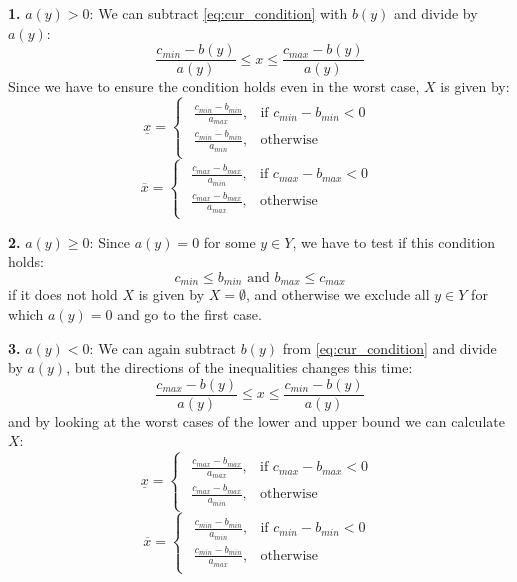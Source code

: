 \textbf{1.
}
$a(y) > 0$:
We can subtract \ref{eq:cur_condition} with $b(y)$ and divide by $a(y)$:
\[
	\frac{c_{min}-b(y)}{a(y)} \leq x \leq \frac{c_{max}-b(y)}{a(y)}
\]
Since we have to ensure the condition holds even in the worst case, $X$ is given by:
\[
	\underline{x} =
	\begin{cases}
		\begin{array}{ll}
			\frac{c_{min}-b_{min}}{a_{max}}, & \text{if } c_{min}-b_{min} < 0 \\[10pt]
			\frac{c_{min}-b_{min}}{a_{min}}, & \text{otherwise}
		\end{array}
	\end{cases}
\]
\[
	\overline{x} =
	\begin{cases}
		\begin{array}{ll}
			\frac{c_{max}-b_{max}}{a_{min}}, & \text{if } c_{max}-b_{max} < 0 \\[10pt]
			\frac{c_{max}-b_{max}}{a_{max}}, & \text{otherwise}
		\end{array}
	\end{cases}
\]

\textbf{2.}
$a(y) \geq 0$:
Since $a(y) = 0$ for some $y\in Y$, we have to test if this condition holds:
\[
	c_{min} \leq b_{min} \text{ and } b_{max} \leq c_{max}
\]
if it does not hold $X$ is given by $X=\emptyset$, and otherwise we exclude all $y\in Y$ for which $a(y)=0$ and go to the first case.

\textbf{3.}
$a(y) < 0$:
We can again subtract $b(y)$ from \ref{eq:cur_condition} and divide by $a(y)$, but the directions of the inequalities changes this time:
\[
	\frac{c_{max}-b(y)}{a(y)} \leq x \leq \frac{c_{min}-b(y)}{a(y)}
\]
and by looking at the worst cases of the lower and upper bound we can calculate $X$:
\[
	\underline{x} =
	\begin{cases}
		\begin{array}{ll}
			\frac{c_{max}-b_{max}}{a_{max}}, & \text{if } c_{max}-b_{max} < 0 \\[10pt]
			\frac{c_{max}-b_{max}}{a_{min}}, & \text{otherwise}
		\end{array}
	\end{cases}
\]
\[
	\overline{x} =
	\begin{cases}
		\begin{array}{ll}
			\frac{c_{min}-b_{min}}{a_{min}}, & \text{if } c_{min}-b_{min} < 0 \\[10pt]
			\frac{c_{min}-b_{min}}{a_{max}}, & \text{otherwise}
		\end{array}
	\end{cases}
\]

